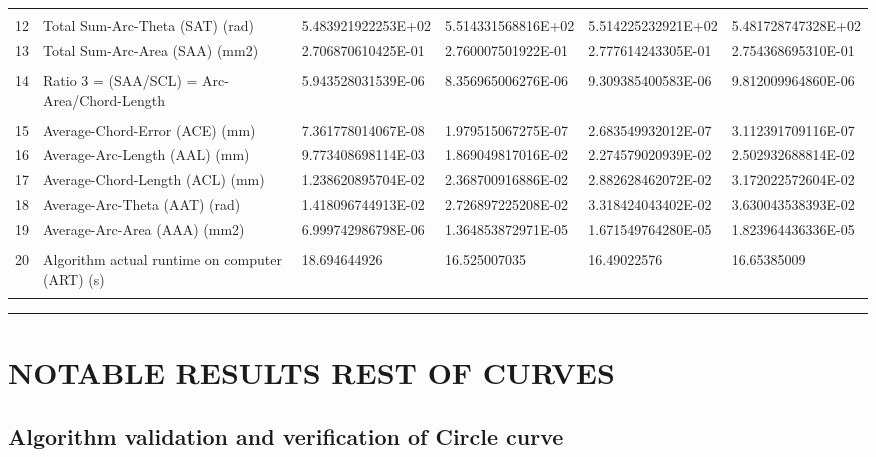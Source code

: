 \begin{landscape}
\begin{table}[ht]
{\begin{tabular}{ p{0.2cm} p{8.80cm} p{4.00cm} p{4.0cm} p{4.00cm} p{4.0cm}}
&		&		&		&		&		\\
12	&	Total Sum-Arc-Theta (SAT) (rad)	&	5.483921922253E+02	&	5.514331568816E+02	&	5.514225232921E+02	&	5.481728747328E+02	\\
13	&	Total Sum-Arc-Area (SAA) (mm2)	&	2.706870610425E-01	&	2.760007501922E-01	&	2.777614243305E-01	&	2.754368695310E-01	\\
&		&		&		&		&		\\
14	&	Ratio 3 = (SAA/SCL) = Arc-Area/Chord-Length	&	5.943528031539E-06	&	8.356965006276E-06	&	9.309385400583E-06	&	9.812009964860E-06	\\
&		&		&		&		&		\\
15	&	Average-Chord-Error (ACE) (mm)	&	7.361778014067E-08	&	1.979515067275E-07	&	2.683549932012E-07	&	3.112391709116E-07	\\
16	&	Average-Arc-Length (AAL) (mm)	&	9.773408698114E-03	&	1.869049817016E-02	&	2.274579020939E-02	&	2.502932688814E-02	\\
17	&	Average-Chord-Length (ACL) (mm)	&	1.238620895704E-02	&	2.368700916886E-02	&	2.882628462072E-02	&	3.172022572604E-02	\\
18	&	Average-Arc-Theta (AAT) (rad)	&	1.418096744913E-02	&	2.726897225208E-02	&	3.318424043402E-02	&	3.630043538393E-02	\\
19	&	Average-Arc-Area (AAA) (mm2)	&	6.999742986798E-06	&	1.364853872971E-05	&	1.671549764280E-05	&	1.823964436336E-05	\\
&		&		&		&		&		\\
20	&	Algorithm actual runtime on computer (ART) (s) 	&	18.694644926	&	16.525007035	&	16.49022576	&	16.65385009	\\
&		&		&		&		&		

\end{tabular}
			
}   %
\hrule
\end{table}
\end{landscape}


\clearpage
\pagebreak
\section{NOTABLE RESULTS REST OF CURVES} 
\label{Notable Results Rest of Curves}

\subsection{Algorithm validation and verification of Circle curve}
\label{ssec-Algorithm validation and verification of Circle curve}

